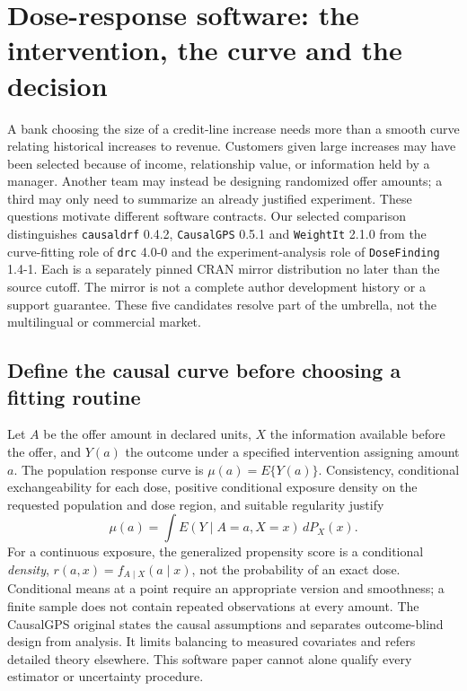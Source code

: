 \section{Dose-response software: the intervention, the curve and the decision}
\label{sec:exec24-dose-response-reuse}

A bank choosing the size of a credit-line increase needs more than a smooth
curve relating historical increases to revenue. Customers given large increases
may have been selected because of income, relationship value, or information
held by a manager. Another team may instead be designing randomized offer
amounts; a third may only need to summarize an already justified experiment.
These questions motivate different software contracts. Our selected comparison
distinguishes \texttt{causaldrf} 0.4.2, \texttt{CausalGPS} 0.5.1 and
\texttt{WeightIt} 2.1.0 from the curve-fitting role of \texttt{drc} 4.0-0 and
the experiment-analysis role of \texttt{DoseFinding} 1.4-1. Each is a separately
pinned CRAN mirror distribution no later than the source cutoff. The mirror is
not a complete author development history or a support guarantee. These five
candidates resolve part of the umbrella, not the multilingual or commercial
market.~\citep{exec24_dose_causaldrf,exec24_dose_causalgps,exec24_dose_weightit,exec24_dose_drc,exec24_dose_dosefinding}

\subsection{Define the causal curve before choosing a fitting routine}
Let $A$ be the offer amount in declared units, $X$ the information available
before the offer, and $Y(a)$ the outcome under a specified intervention assigning
amount $a$. The population response curve is $\mu(a)=E\{Y(a)\}$. Consistency,
conditional exchangeability for each dose, positive conditional exposure density
on the requested population and dose region, and suitable regularity justify
\[
 \mu(a)=\int E(Y\mid A=a,X=x)\,dP_X(x).
\]
For a continuous exposure, the generalized propensity score is a conditional
\emph{density}, $r(a,x)=f_{A\mid X}(a\mid x)$, not the probability of an exact
dose. Conditional means at a point require an appropriate version and
smoothness; a finite sample does not contain repeated observations at every
amount. The CausalGPS original states the causal assumptions and separates
outcome-blind design from analysis. It limits balancing to measured covariates
and refers detailed theory elsewhere. This software paper cannot alone qualify
every estimator or uncertainty procedure.~\citep{exec24_dose_original}


